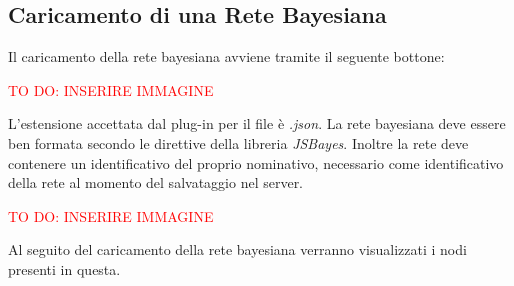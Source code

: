 \subsection{Caricamento di una Rete Bayesiana}\label{ReteB}

Il caricamento della rete bayesiana avviene tramite il seguente bottone: 

\textcolor{red}{TO DO: INSERIRE IMMAGINE} 

L'estensione accettata dal plug-in per il file è \textit{.json}. La rete bayesiana deve essere ben formata secondo le direttive della libreria \textit{JSBayes}. Inoltre la rete deve contenere un identificativo del proprio nominativo, necessario come identificativo della rete al momento del salvataggio nel server.

\textcolor{red}{TO DO: INSERIRE IMMAGINE} 

Al seguito del caricamento della rete bayesiana verranno visualizzati i nodi presenti in questa. \\
